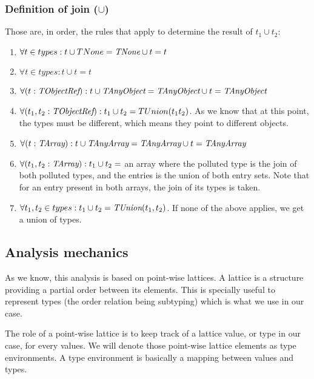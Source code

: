 \documentclass[a4paper]{article}
\begin{document}
\subsubsection{Definition of join ($\cup$)}
Those are, in order, the rules that apply to determine the result of $t_1 \cup t_2$:
\begin{enumerate}
  \item $\forall t \in types : t \cup TNone = \emph{TNone} \cup t = t$
  \item $\forall t \in types : t \cup t = t$
  \item $\forall (t: \emph{TObjectRef}): t \cup \emph{TAnyObject} = \emph{TAnyObject} \cup t = \emph{TAnyObject}$
  \item $\forall (t_1,t_2: \emph{TObjectRef}): t_1 \cup t_2 = TUnion(t_1 t_2)$. As we
    know that at this point, the types must be different, which means they
    point to different objects.
  \item $\forall (t: \emph{TArray}): t \cup \emph{TAnyArray} = \emph{TAnyArray} \cup t = \emph{TAnyArray}$
  \item $\forall (t_1,t_2: \emph{TArray}): t_1 \cup t_2 = $ an array where the
    polluted type is the join of both polluted types, and the entries is the
    union of both entry sets. Note that for an entry present in both arrays,
    the join of its types is taken.

  \item $\forall t_1,t_2 \in types: t_1 \cup t_2 = \emph{TUnion}(t_1, t_2)$. If none of the above applies, we get a union of types.
\end{enumerate}

\subsection{Analysis mechanics}
As we know, this analysis is based on point-wise lattices. A lattice is a
structure providing a partial order between its elements. This is specially
useful to represent types (the order relation being subtyping) which is what
we use in our case.

The role of a point-wise lattice is to keep track of a lattice value, or type in
our case, for every values. We will denote those point-wise lattice elements as
type environments. A type environment is basically a mapping between values and
types.
\end{document}
